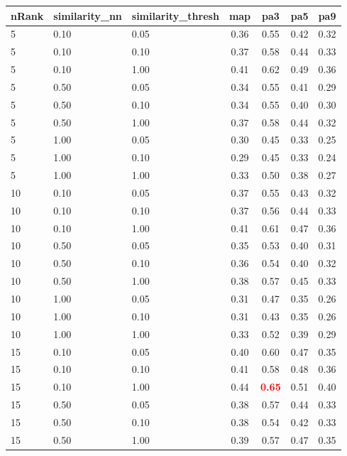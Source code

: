 \documentclass[12pt,a4paper,fleqn]{tufte-handout}
\begin{document}
 
\begin{table}      
\begin{center}      
\scriptsize      
\setlength{\tabcolsep}{.16667em}      
\begin{tabular}{lllcccc}      
nRank & similarity\_nn & similarity\_thresh & map & pa3 & pa5 & pa9 \\      
\hline      
5 & 0.10 & 0.05 & 0.36 & 0.55 & 0.42 & 0.32 \\      
5 & 0.10 & 0.10 & 0.37 & 0.58 & 0.44 & 0.33 \\      
5 & 0.10 & 1.00 & 0.41 & 0.62 & 0.49 & 0.36 \\      
5 & 0.50 & 0.05 & 0.34 & 0.55 & 0.41 & 0.29 \\      
5 & 0.50 & 0.10 & 0.34 & 0.55 & 0.40 & 0.30 \\      
5 & 0.50 & 1.00 & 0.37 & 0.58 & 0.44 & 0.32 \\      
5 & 1.00 & 0.05 & 0.30 & 0.45 & 0.33 & 0.25 \\      
5 & 1.00 & 0.10 & 0.29 & 0.45 & 0.33 & 0.24 \\      
5 & 1.00 & 1.00 & 0.33 & 0.50 & 0.38 & 0.27 \\      
10 & 0.10 & 0.05 & 0.37 & 0.55 & 0.43 & 0.32 \\      
10 & 0.10 & 0.10 & 0.37 & 0.56 & 0.44 & 0.33 \\      
10 & 0.10 & 1.00 & 0.41 & 0.61 & 0.47 & 0.36 \\      
10 & 0.50 & 0.05 & 0.35 & 0.53 & 0.40 & 0.31 \\      
10 & 0.50 & 0.10 & 0.36 & 0.54 & 0.40 & 0.32 \\      
10 & 0.50 & 1.00 & 0.38 & 0.57 & 0.45 & 0.33 \\      
10 & 1.00 & 0.05 & 0.31 & 0.47 & 0.35 & 0.26 \\      
10 & 1.00 & 0.10 & 0.31 & 0.43 & 0.35 & 0.26 \\      
10 & 1.00 & 1.00 & 0.33 & 0.52 & 0.39 & 0.29 \\      
15 & 0.10 & 0.05 & 0.40 & 0.60 & 0.47 & 0.35 \\      
15 & 0.10 & 0.10 & 0.41 & 0.58 & 0.48 & 0.36 \\      
15 & 0.10 & 1.00 & 0.44 & \textbf{\textcolor{red}{0.65}} & 0.51 & 0.40 \\      
15 & 0.50 & 0.05 & 0.38 & 0.57 & 0.44 & 0.33 \\      
15 & 0.50 & 0.10 & 0.38 & 0.54 & 0.42 & 0.33 \\      
15 & 0.50 & 1.00 & 0.39 & 0.57 & 0.47 & 0.35 \\      

\end{tabular}
\end{center}
\end{table}
\end{document}
